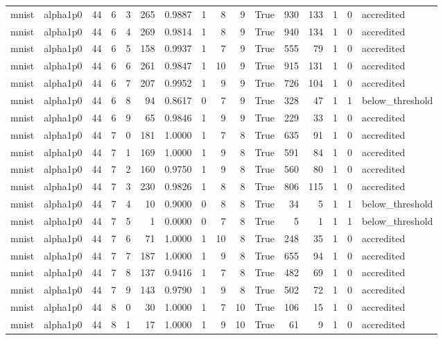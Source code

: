 \begin{tabular}{llrrrrrrrrrrrrrl}
mnist & alpha1p0 & 44 & 6 & 3 & 265 & 0.9887 & 1 & 8 & 9 & True & 930 & 133 & 1 & 0 & accredited \\
mnist & alpha1p0 & 44 & 6 & 4 & 269 & 0.9814 & 1 & 8 & 9 & True & 940 & 134 & 1 & 0 & accredited \\
mnist & alpha1p0 & 44 & 6 & 5 & 158 & 0.9937 & 1 & 7 & 9 & True & 555 & 79 & 1 & 0 & accredited \\
mnist & alpha1p0 & 44 & 6 & 6 & 261 & 0.9847 & 1 & 10 & 9 & True & 915 & 131 & 1 & 0 & accredited \\
mnist & alpha1p0 & 44 & 6 & 7 & 207 & 0.9952 & 1 & 9 & 9 & True & 726 & 104 & 1 & 0 & accredited \\
mnist & alpha1p0 & 44 & 6 & 8 & 94 & 0.8617 & 0 & 7 & 9 & True & 328 & 47 & 1 & 1 & below\_threshold \\
mnist & alpha1p0 & 44 & 6 & 9 & 65 & 0.9846 & 1 & 9 & 9 & True & 229 & 33 & 1 & 0 & accredited \\
mnist & alpha1p0 & 44 & 7 & 0 & 181 & 1.0000 & 1 & 7 & 8 & True & 635 & 91 & 1 & 0 & accredited \\
mnist & alpha1p0 & 44 & 7 & 1 & 169 & 1.0000 & 1 & 9 & 8 & True & 591 & 84 & 1 & 0 & accredited \\
mnist & alpha1p0 & 44 & 7 & 2 & 160 & 0.9750 & 1 & 9 & 8 & True & 560 & 80 & 1 & 0 & accredited \\
mnist & alpha1p0 & 44 & 7 & 3 & 230 & 0.9826 & 1 & 8 & 8 & True & 806 & 115 & 1 & 0 & accredited \\
mnist & alpha1p0 & 44 & 7 & 4 & 10 & 0.9000 & 0 & 8 & 8 & True & 34 & 5 & 1 & 1 & below\_threshold \\
mnist & alpha1p0 & 44 & 7 & 5 & 1 & 0.0000 & 0 & 7 & 8 & True & 5 & 1 & 1 & 1 & below\_threshold \\
mnist & alpha1p0 & 44 & 7 & 6 & 71 & 1.0000 & 1 & 10 & 8 & True & 248 & 35 & 1 & 0 & accredited \\
mnist & alpha1p0 & 44 & 7 & 7 & 187 & 1.0000 & 1 & 9 & 8 & True & 655 & 94 & 1 & 0 & accredited \\
mnist & alpha1p0 & 44 & 7 & 8 & 137 & 0.9416 & 1 & 7 & 8 & True & 482 & 69 & 1 & 0 & accredited \\
mnist & alpha1p0 & 44 & 7 & 9 & 143 & 0.9790 & 1 & 9 & 8 & True & 502 & 72 & 1 & 0 & accredited \\
mnist & alpha1p0 & 44 & 8 & 0 & 30 & 1.0000 & 1 & 7 & 10 & True & 106 & 15 & 1 & 0 & accredited \\
mnist & alpha1p0 & 44 & 8 & 1 & 17 & 1.0000 & 1 & 9 & 10 & True & 61 & 9 & 1 & 0 & accredited \\

\end{tabular}
